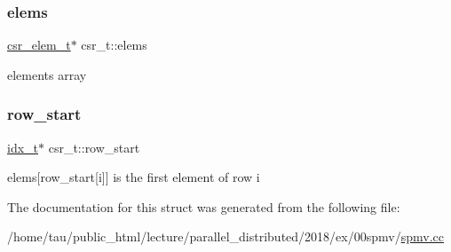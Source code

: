 \subsubsection{\texorpdfstring{elems}{elems}}
{\footnotesize\ttfamily \hyperlink{structcsr__elem__t}{csr\+\_\+elem\+\_\+t}$\ast$ csr\+\_\+t\+::elems}

elements array \mbox{\label{structcsr__t_ac52d7a1ff3a054e2b8c7fcc706e525b6}} 
\subsubsection{\texorpdfstring{row\+\_\+start}{row\_start}}
{\footnotesize\ttfamily \hyperlink{spmv_8cc_a8e93478a00e685bea5e6a3f617bf03a3}{idx\+\_\+t}$\ast$ csr\+\_\+t\+::row\+\_\+start}

elems\mbox{[}row\+\_\+start\mbox{[}i\mbox{]}\mbox{]} is the first element of row i 

The documentation for this struct was generated from the following file\+:\begin{DoxyCompactItemize}
\item 
/home/tau/public\+\_\+html/lecture/parallel\+\_\+distributed/2018/ex/00spmv/\hyperlink{spmv_8cc}{spmv.\+cc}\end{DoxyCompactItemize}
